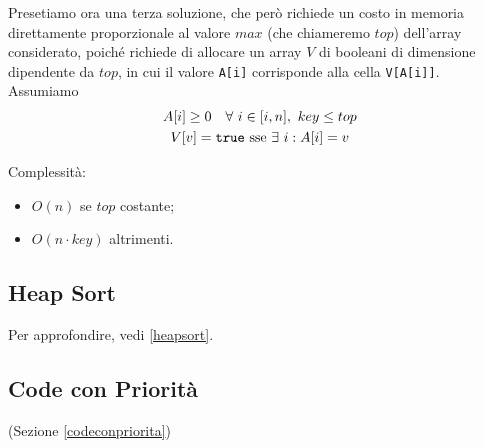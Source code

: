 Presetiamo ora una terza soluzione, che però richiede un costo in memoria direttamente proporzionale al valore $max$ (che chiameremo $top$)
dell'array considerato, poiché richiede di allocare un array $V$ di booleani di dimensione dipendente da $top$, in cui il valore \texttt{A[i]} corrisponde alla cella \texttt{V[A[i]]}. Assumiamo
\begin{gather*}
	A[i] \geq 0 \quad \forall i \in [i,n], \ key \leq top \\
	V[v] = \text{\texttt{true} sse } \exists i : A[i] = v 
\end{gather*}


Complessità:
\begin{itemize}
	\item $O(n)$ se $top$ costante;
	\item $O(n \cdot key)$ altrimenti.
\end{itemize}
\newpage
\subsection{Heap Sort}
Per approfondire, vedi \ref{heapsort}. 







\subsection{Code con Priorità}
(Sezione \ref{codeconpriorita})






